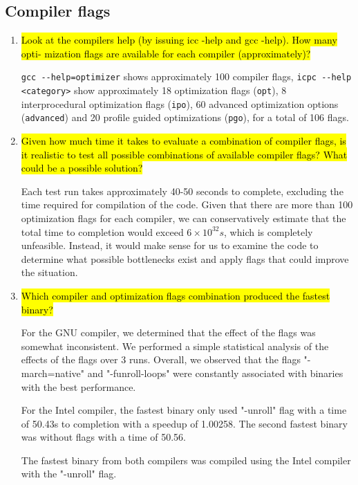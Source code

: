 \documentclass{article}
\begin{document}
\subsection{Compiler flags}
\begin{enumerate}
	\item \hl{Look at the compilers help (by issuing icc -help and gcc -help). How many opti-
	mization flags are available for each compiler (approximately)?}

	\verb!gcc --help=optimizer! shows approximately 100 compiler flags, \verb!icpc --help <category>! show approximately 18 optimization flags (\verb!opt!), 8 interprocedural optimization flags (\verb!ipo!), 60 advanced optimization options (\verb!advanced!) and 20 profile guided optimizations (\verb!pgo!), for a total of 106 flags.

	\item \hl{Given how much time it takes to evaluate a combination of compiler flags, is it realistic to test all possible combinations of available compiler flags? What could be a possible solution?}

	Each test run takes approximately 40-50 seconds to complete, excluding the time required for compilation of the code. Given that there are more than 100 optimization flags for each compiler, we can conservatively estimate that the total time to completion would exceed $6\times10^{32}s$, which is completely unfeasible. Instead, it would make sense for us to examine the code to determine what possible bottlenecks exist and apply flags that could improve the situation.

	\item \hl{Which compiler and optimization flags combination produced the fastest binary?}

	For the GNU compiler, we determined that the effect of the flags was somewhat inconsistent. We performed a simple statistical analysis of the effects of the flags over 3 runs. Overall, we observed that the flags "-march=native" and "-funroll-loops" were constantly associated with binaries with the best performance.

	For the Intel compiler, the fastest binary only used "-unroll" flag with a time of 50.43s to completion with a speedup of 1.00258. The second fastest binary was without flags with a time of 50.56.

	The fastest binary from both compilers was compiled using the Intel compiler with the "-unroll" flag.
\end{enumerate}
\end{document}
